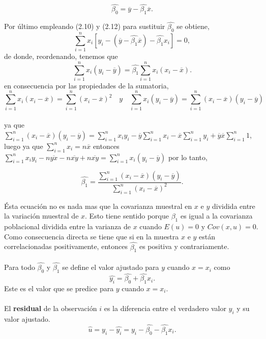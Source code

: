 \begin{tcolorbox}[colframe=white]
\begin{equation}
    \hat{\beta_0} = \overline{y} - \hat{\beta_1}\overline{x}.
\end{equation}
\end{tcolorbox}
Por último empleando (2.10) y (2.12) para sustituir $\hat{\beta_0}$ se obtiene,
$$\sum_{i=1}^n x_i\left[y_i-(\overline{y}-\hat{\beta_1}\overline{x})-\hat{\beta_1}x_i\right] = 0,$$
de donde, reordenando, tenemos que
$$\sum_{i=1}^n x_i(y_i-\overline{y}) = \hat{\beta_1}\sum_{i=1}^n x_i(x_i-\overline{x}).$$
en consecuencia por las propiedades de la sumatoria, 
$$\sum_{i=1}^n x_i(x_i-\overline{x}) = \sum_{i=1}^n (x_i-\overline{x})^2 \quad y \quad \sum_{i=1}^n x_i(y_i-\overline{y}) = \sum_{i=1}^n (x_i-\overline{x})(y_i-\overline{y})$$\\
ya que $\sum\limits_{i=1}^n (x_i-\overline{x})(y_i-\overline{y})=\sum\limits_{i=1}^n x_i y_i - \overline{y}\sum\limits_{i=1}^n x_i - \overline{x}\sum\limits_{i=1}^n y_i + \overline{y} \overline{x}\sum\limits_{i=1}^n 1 $, luego ya que $\sum\limits_{i=1}^n x_i = n\overline{x}$ entonces $\sum\limits_{i=1}^n x_iy_i - n\overline{yx} - n\overline{xy} + n\overline{xy} = \sum\limits_{i=1}^n x_i(y_i-\overline{y})$
por lo tanto, 
\begin{tcolorbox}[colframe=white]
\begin{equation}
    \hat{\beta_1} = \frac{\sum\limits_{i=1}^n (x_i-\overline{x})(y_i-\overline{y})}{\sum\limits_{i=1}^n (x_i-\overline{x})^2}.
\end{equation}
\end{tcolorbox}
Ésta ecuación no es nada mas que la covarianza muestral en $x$ e $y$ dividida entre la variación muestral de $x$. Esto tiene sentido porque $\beta_1$ es igual a la covarianza poblacional dividida entre la varianza de $x$ cuando $E(u)=0$ y $Cov(x,u) = 0$. Como consecuencia directa se tiene que si en la muestra $x$ e $y$ están correlacionadas positivamente, entonces $\hat{\beta_1}$ es positiva y contrariamente.\\\\
Para todo $\hat{\beta_0}$ y $\hat{\beta_1}$ se define el valor ajustado para $y$ cuando $x=x_i$ como 
\begin{equation}
	\hat{y_i} = \hat{\beta_0} + \hat{\beta_1}x_i.
\end{equation}
Este es el valor que se predice para $y$ cuando $x=x_i$.\\\\
El \textbf{residual} de la observación $i$ es la diferencia entre el verdadero valor $y_i$ y su valor ajustado.\begin{equation} 
    \hat{u} = y_i - \hat{y_i} = y_i - \hat{\beta_0} - \hat{\beta_1}x_i.
\end{equation}
